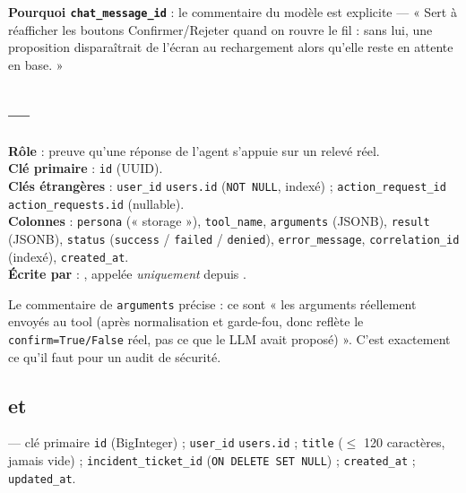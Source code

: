 \textbf{Pourquoi \texttt{chat\_message\_id}} : le commentaire du modèle est
explicite --- « Sert à réafficher les boutons Confirmer/Rejeter quand on rouvre
le fil : sans lui, une proposition disparaîtrait de l'écran au rechargement
alors qu'elle reste en attente en base. »

\subsection{ --- }

\textbf{Rôle} : preuve qu'une réponse de l'agent s'appuie sur un relevé réel.\\
\textbf{Clé primaire} : \texttt{id} (UUID).\\
\textbf{Clés étrangères} : \texttt{user\_id} \arrowto{} \texttt{users.id}
(\texttt{NOT NULL}, indexé) ; \texttt{action\_request\_id} \arrowto{}
\texttt{action\_requests.id} (nullable).\\
\textbf{Colonnes} : \texttt{persona} (« storage »), \texttt{tool\_name},
\texttt{arguments} (JSONB), \texttt{result} (JSONB), \texttt{status}
(\texttt{success} / \texttt{failed} / \texttt{denied}), \texttt{error\_message},
\texttt{correlation\_id} (indexé), \texttt{created\_at}.\\
\textbf{Écrite par} : , appelée \emph{uniquement}
depuis .

\begin{infobox}
Le commentaire de \texttt{arguments} précise : ce sont « les arguments réellement
envoyés au tool (après normalisation et garde-fou, donc reflète le
\texttt{confirm=True/False} réel, pas ce que le LLM avait proposé) ». C'est
exactement ce qu'il faut pour un audit de sécurité.
\end{infobox}

\subsection{ et }

\textbf{} --- clé primaire \texttt{id} (BigInteger) ;
\texttt{user\_id} \arrowto{} \texttt{users.id} ; \texttt{title}
(\(\le\) 120 caractères, jamais vide) ; \texttt{incident\_ticket\_id}
(\texttt{ON DELETE SET NULL}) ; \texttt{created\_at} ; \texttt{updated\_at}.

